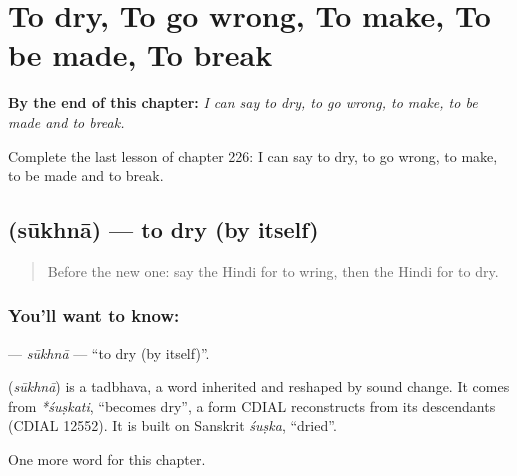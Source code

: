 
\chapter{To dry, To go wrong, To make, To be made, To break}
\label{ch:hi-to-dry-to-go-wrong-to-make-to-be-made-to-break}

\begin{chapteropening}
\textbf{By the end of this chapter:} \emph{I can say to dry, to go wrong, to make, to be made and to break.}

Complete the last lesson of chapter 226: I can say to dry, to go wrong, to make, to be made and to break.
\end{chapteropening}

\section[\texorpdfstring{\hi{सूखना} (sūkhnā)}{सूखना (sūkhnā)}]{ (sūkhnā) — to dry (by itself)}

\label{lesson:HI-C226-sukhna}



\begin{quote}
Before the new one: say the Hindi for to wring, then the Hindi for to dry.
\end{quote}

\subsection*{You'll want to know: }
\textbf{} — \emph{sūkhnā} — \textquotedblleft{}to dry (by itself)\textquotedblright{}.

\begin{cousinweb}
\textbf{} (\emph{sūkhnā}) is a tadbhava, a word inherited and reshaped by sound change. It comes from \emph{*śuṣkati}, \textquotedblleft{}becomes dry\textquotedblright{}, a form CDIAL reconstructs from its descendants (CDIAL 12552). It is built on Sanskrit \emph{śuṣka}, \textquotedblleft{}dried\textquotedblright{}.
\end{cousinweb}

\begin{grammarlens}[title={What you've built}]
One more word for this chapter.
\end{grammarlens}

